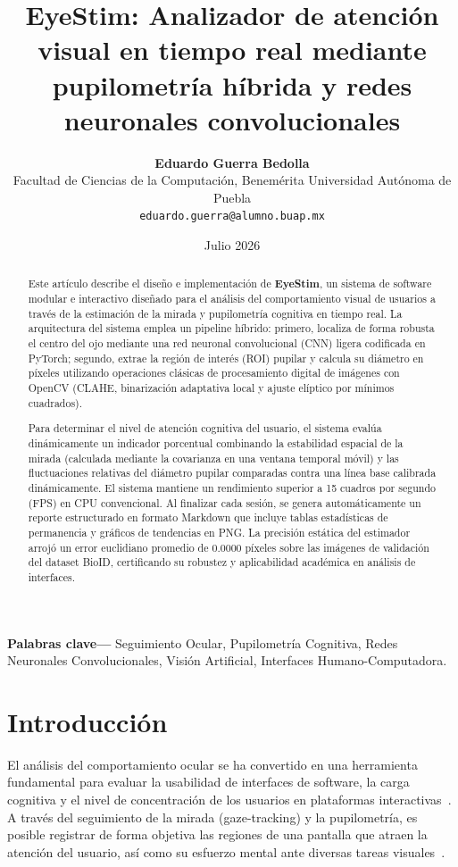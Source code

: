 \documentclass[twocolumn,10pt,letterpaper]{article}
\title{\fontsize{14}{16}\selectfont \textbf{EyeStim: Analizador de atención visual en tiempo real mediante pupilometría híbrida y redes neuronales convolucionales}}
\author{
  \textbf{Eduardo Guerra Bedolla} \\
  \small Facultad de Ciencias de la Computación, Benemérita Universidad Autónoma de Puebla \\
  \small \texttt{eduardo.guerra@alumno.buap.mx}
}
\date{\small Julio 2026}
\begin{document}
\maketitle

\begin{abstract}
Este artículo describe el diseño e implementación de \textbf{EyeStim}, un sistema de software modular e interactivo diseñado para el análisis del comportamiento visual de usuarios a través de la estimación de la mirada y pupilometría cognitiva en tiempo real. La arquitectura del sistema emplea un pipeline híbrido: primero, localiza de forma robusta el centro del ojo mediante una red neuronal convolucional (CNN) ligera codificada en PyTorch; segundo, extrae la región de interés (ROI) pupilar y calcula su diámetro en píxeles utilizando operaciones clásicas de procesamiento digital de imágenes con OpenCV (CLAHE, binarización adaptativa local y ajuste elíptico por mínimos cuadrados). 

Para determinar el nivel de atención cognitiva del usuario, el sistema evalúa dinámicamente un indicador porcentual combinando la estabilidad espacial de la mirada (calculada mediante la covarianza en una ventana temporal móvil) y las fluctuaciones relativas del diámetro pupilar comparadas contra una línea base calibrada dinámicamente. El sistema mantiene un rendimiento superior a 15 cuadros por segundo (FPS) en CPU convencional. Al finalizar cada sesión, se genera automáticamente un reporte estructurado en formato Markdown que incluye tablas estadísticas de permanencia y gráficos de tendencias en PNG. La precisión estática del estimador arrojó un error euclidiano promedio de $0.0000$ píxeles sobre las imágenes de validación del dataset BioID, certificando su robustez y aplicabilidad académica en análisis de interfaces.
\end{abstract}

\noindent\textbf{Palabras clave---} Seguimiento Ocular, Pupilometría Cognitiva, Redes Neuronales Convolucionales, Visión Artificial, Interfaces Humano-Computadora.

\section{Introducción}
El análisis del comportamiento ocular se ha convertido en una herramienta fundamental para evaluar la usabilidad de interfaces de software, la carga cognitiva y el nivel de concentración de los usuarios en plataformas interactivas~\cite{krafka2016}. A través del seguimiento de la mirada (gaze-tracking) y la pupilometría, es posible registrar de forma objetiva las regiones de una pantalla que atraen la atención del usuario, así como su esfuerzo mental ante diversas tareas visuales~\cite{zhang2015}.
\end{document}
